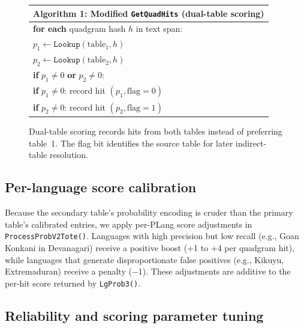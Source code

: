 \documentclass{article}
\begin{document}
\begin{figure}[t]
\centering
\small
\begin{tabular}{@{}l@{}}
\toprule
\textbf{Algorithm 1}: Modified \texttt{GetQuadHits} (dual-table scoring) \\
\midrule
\textbf{for each} quadgram hash $h$ in text span: \\
\quad $p_1 \leftarrow \texttt{Lookup}(\text{table}_1, h)$ \\
\quad $p_2 \leftarrow \texttt{Lookup}(\text{table}_2, h)$ \\
\quad \textbf{if} $p_1 \neq 0$ \textbf{or} $p_2 \neq 0$: \\
\quad\quad \textbf{if} $p_1 \neq 0$: record hit $(p_1, \text{flag}=0)$ \\
\quad\quad \textbf{if} $p_2 \neq 0$: record hit $(p_2, \text{flag}=1)$ \\
\bottomrule
\end{tabular}
\caption{Dual-table scoring records hits from both tables instead of preferring table~1. The flag bit identifies the source table for later indirect-table resolution.}
\label{alg:dual}
\end{figure}

\subsection{Per-language score calibration}
\label{sec:boosts}

Because the secondary table's probability encoding is cruder than the primary table's calibrated entries, we apply per-PLang score adjustments in \texttt{ProcessProbV2Tote()}.
Languages with high precision but low recall (e.g., Goan Konkani in Devanagari) receive a positive boost (+1 to +4 per quadgram hit), while languages that generate disproportionate false positives (e.g., Kikuyu, Extremaduran) receive a penalty ($-$1).
These adjustments are additive to the per-hit score returned by \texttt{LgProb3()}.

\subsection{Reliability and scoring parameter tuning}
\label{sec:paramtuning}
\end{document}
